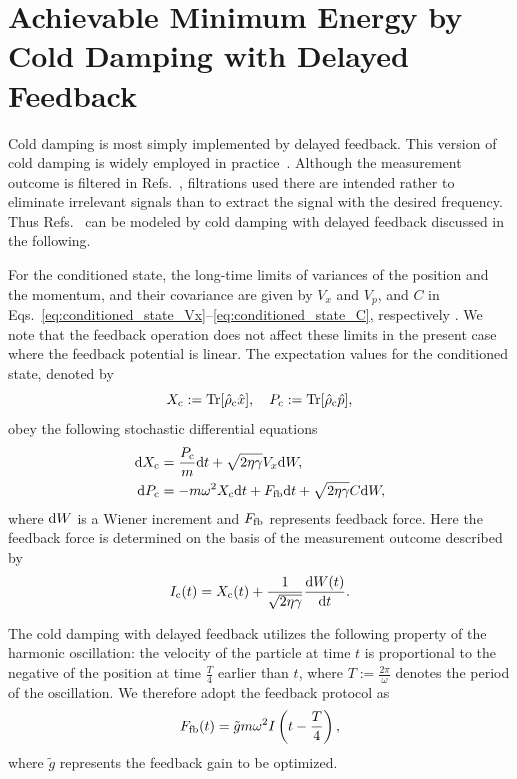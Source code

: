 \documentclass[aps,pra,superscriptaddress,twocolumn
]{revtex4-2}
\renewcommand{\d}{{\rm d}}
\begin{document}
{
\section{Achievable Minimum Energy by Cold Damping with Delayed Feedback}\label{sec:CD-DaleyedFB}

{
Cold damping is most simply implemented by delayed feedback. 
This version of cold damping is widely employed in 
practice~\cite{PhysRevLett.96.043003,tebbenjohanns2021quantum,Kamba:22}.
Although the measurement outcome is filtered in
Refs.~\cite{PhysRevLett.96.043003,tebbenjohanns2021quantum,Kamba:22},
filtrations used there are intended rather to eliminate irrelevant signals 
than to extract the signal with the desired frequency. 
Thus Refs.~\cite{PhysRevLett.96.043003,tebbenjohanns2021quantum,Kamba:22} 
can be modeled by cold damping with delayed feedback discussed in the following.
}


For the conditioned state,
the long-time limits of variances of the position and the momentum, and their covariance
are given by $V_x$ and $V_p$, and $C$ in 
Eqs.~\eqref{eq:conditioned_state_Vx}--\eqref{eq:conditioned_state_C}, 
respectively \cite{PhysRevA.60.2700}. 
We note that the feedback operation does not affect these limits 
in the present case where the feedback potential is linear.
The expectation values for the conditioned state, 
denoted by 
\begin{equation}
  X_{\rm c} := \Tr[\hat \rho_{\rm c} \hat x],\quad 
  P_{\rm c} := \Tr[\hat \rho_{\rm c} \hat p], 
\end{equation}
obey the following stochastic differential equations \cite{PhysRevA.60.2700}
\begin{alignat}{1}
  \d X_{\rm c} &= \frac{P_{\rm c}}{m}\d t + \sqrt{2\eta \gamma} V_x \d W, \\
  \d P_{\rm c} &= -m\omega^2 X_{\rm c} \d t + F_{\rm fb} \d t + \sqrt{2\eta \gamma} C \d W,
\end{alignat}
where $\d W$ is a Wiener increment and 
$F_{\rm fb}$ represents feedback force.
Here the feedback force is determined on the basis of the measurement outcome 
described by \cite{PhysRevA.60.2700}
\begin{equation}
  I_{\rm c} (t) = X_{\rm c} (t) + \frac{1}{\sqrt{2 \eta \gamma}} \frac{\d W(t)}{\d t}.
\end{equation}

The cold damping with delayed feedback utilizes the following property of the harmonic oscillation: 
the velocity of the particle at time $t$ 
is proportional to the negative of the position at time $\frac{T}{4}$ earlier than $t$, 
where $T := \frac{2\pi}{\omega}$ denotes the period of the oscillation. 
We therefore adopt the feedback protocol as 
\begin{equation}
  F_{\rm fb} (t) = \tilde g m \omega^2 I\left(t - \frac{T}{4}\right),
\end{equation}
where $\tilde g$ represents the feedback gain to be optimized.

}
\end{document}
